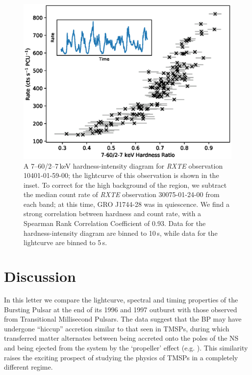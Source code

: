 

\begin{figure}
  \centering
  \includegraphics[width=.9\linewidth, trim={0.6cm 0.1cm 1.0cm 1cm},clip]{images/hr.eps}
  \caption{\small  A 7--60/2--7\,keV hardness-intensity diagram for \textit{RXTE} observation 10401-01-59-00; the lightcurve of this observation is shown in the inset.  To correct for the high background of the region, we subtract the median count rate of \textit{RXTE} observation 30075-01-24-00 from each band; at this time, GRO J1744-28 was in quiescence.  We find a strong correlation between hardness and count rate, with a Spearman Rank Correlation Coefficient of 0.93.  Data for the hardness-intensity diagram are binned to 10\,s, while data for the lightcurve are binned to 5\,s.}
  \label{fig:HR}
\end{figure}

\section{Discussion}

\par In this letter we compare the lightcurve, spectral and timing properties of the Bursting Pulsar at the end of its 1996 and 1997 outburst with those observed from Transitional Millisecond Pulsars. The data suggest that the BP may have undergone ``hiccup'' accretion similar to that seen in TMSPs, during which transferred matter alternates between being accreted onto the poles of the NS and being ejected from the system by the `propeller' effect (e.g. \citealp{Ferrigno_TMSPVar}).  This similarity raises the exciting prospect of studying the physics of TMSPs in a completely different regime.

